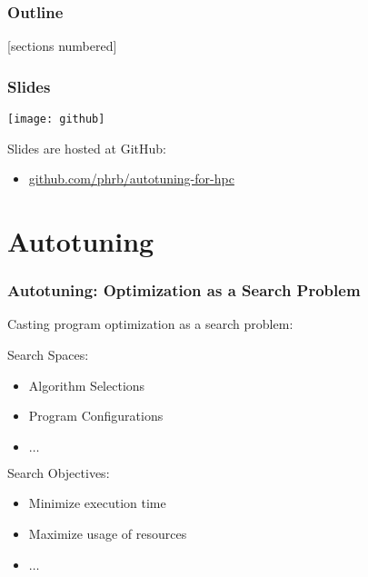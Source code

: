 \documentclass[10pt, compress, aspectratio=169]{beamer}
\begin{document}
\begin{frame}
    \frametitle{Outline}
    [sections numbered]
    \tableofcontents[hideallsubsections]
\end{frame}

\begin{frame}
    \frametitle{Slides}
    \begin{center}
        \texttt{[image: github]}
    \end{center}
    Slides are hosted at \alert{GitHub}:

    \begin{itemize}
        \item \url{github.com/phrb/autotuning-for-hpc}
    \end{itemize}
\end{frame}

\section{Autotuning}

\begin{frame}
    \frametitle{Autotuning: Optimization as a Search Problem}
    Casting \alert{program optimization} as a \alert{search problem}:

    \alert{Search Spaces}:
    \begin{itemize}
        \item Algorithm Selections
        \item Program Configurations
        \item $\dots$
    \end{itemize}

    \alert{Search Objectives}:
    \begin{itemize}
        \item Minimize \alert{execution time}
        \item Maximize \alert{usage of resources}
        \item $\dots$
    \end{itemize}
\end{frame}
\end{document}

